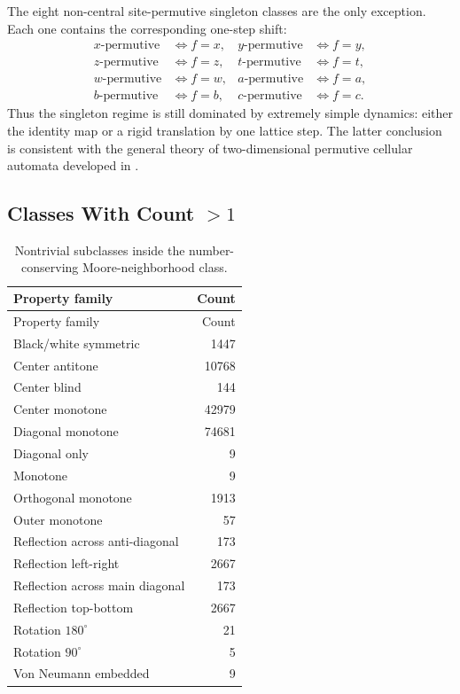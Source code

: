 \documentclass[11pt,a4paper]{article}
\begin{document}
The eight non-central site-permutive singleton classes are the only exception.  Each one contains
the corresponding one-step shift:
\begin{align*}
x\text{-permutive} &\Longleftrightarrow f=x, &
y\text{-permutive} &\Longleftrightarrow f=y, \\
z\text{-permutive} &\Longleftrightarrow f=z, &
t\text{-permutive} &\Longleftrightarrow f=t, \\
w\text{-permutive} &\Longleftrightarrow f=w, &
a\text{-permutive} &\Longleftrightarrow f=a, \\
b\text{-permutive} &\Longleftrightarrow f=b, &
c\text{-permutive} &\Longleftrightarrow f=c.
\end{align*}
Thus the singleton regime is still dominated by extremely simple dynamics: either the identity
map or a rigid translation by one lattice step.  The latter conclusion is consistent with the
general theory of two-dimensional permutive cellular automata developed in
\cite{AlloucheSkordev2003}.

\subsection{Classes With Count \(>1\)}

\begin{longtable}{@{}lr@{}}
\caption{Nontrivial subclasses inside the number-conserving Moore-neighborhood class.}
\label{tab:counts-many}\\
\toprule
Property family & Count \\
\midrule
\endfirsthead
\toprule
Property family & Count \\
\midrule
\endhead
Black/white symmetric & 1447 \\
Center antitone & 10768 \\
Center blind & 144 \\
Center monotone & 42979 \\
Diagonal monotone & 74681 \\
Diagonal only & 9 \\
Monotone & 9 \\
Orthogonal monotone & 1913 \\
Outer monotone & 57 \\
Reflection across anti-diagonal & 173 \\
Reflection left-right & 2667 \\
Reflection across main diagonal & 173 \\
Reflection top-bottom & 2667 \\
Rotation \(180^\circ\) & 21 \\
Rotation \(90^\circ\) & 5 \\
Von Neumann embedded & 9 \\
\bottomrule
\end{longtable}
\end{document}
